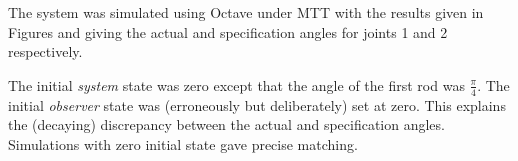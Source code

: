 The system was simulated using Octave under MTT with the results given
in Figures
and
giving the actual and specification angles for joints 1 and 2
respectively.

The initial \emph{system} state was zero except that the angle of the
first rod was $\frac{\pi}{4}$. The initial \emph{observer} state was
(erroneously but deliberately) set at zero. This explains the
(decaying) discrepancy between the actual and specification angles.
Simulations with zero initial state gave precise matching.
